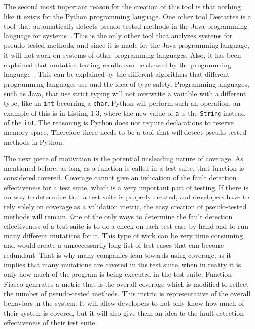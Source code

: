 The second most important reason for the creation of this tool is that nothing like it exists for the Python programming language. One other tool Descartes is a tool that automatically detects pseudo-tested methods in the Java programming language for systems~\cite{vera2018descartes}. This is the only other tool that analyzes systems for pseudo-tested methods, and since it is made for the Java programming language, it will not work on systems of other programming languages. Also, it has been explained that mutation testing results can be skewed by the programming language~\cite{vera2017comprehensive}. This can be explained by the different algorithms that different programming languages use and the idea of type safety. Programming languages, such as Java, that use strict typing will not overwrite a variable with a different type, like an \texttt{int} becoming a \texttt{char}. Python will perform such an operation, an example of this is in Listing 1.3, where the new value of \texttt{a} is the \texttt{String} instead of the \texttt{int}. The reasoning is Python does not require declarations to reserve memory space. Therefore there needs to be a tool that will detect pseudo-tested methods in Python.

The next piece of motivation is the potential misleading nature of coverage. As mentioned before, as long as a function is called in a test suite, that function is considered covered. Coverage cannot give an indication of the fault detection effectiveness for a test suite, which is a very important part of testing. If there is no way to determine that a test suite is properly created, and developers have to rely solely on coverage as a validation metric, the easy creation of pseudo-tested methods will remain. One of the only ways to determine the fault detection effectiveness of a test suite is to do a check on each test case by hand and to run many different mutations for it. This type of work can be very time consuming and would create a unneccessarily long list of test cases that can become redundant. That is why many companies lean towards using coverage, as it implies that many mutations are covered in the test suite, when in reality it is only how much of the program is being executed in the test suite. Function-Fiasco generates a metric that is the overall coverage which is modified to reflect the number of pseudo-tested methods. This metric is representative of the overall behaviors in the system. It will allow developers to not only know how much of their system is covered, but it will also give them an idea to the fault detection effectiveness of their test suite.

